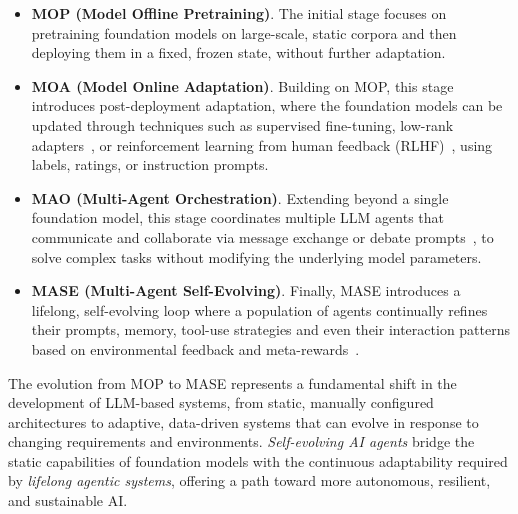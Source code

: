 \documentclass[]{selfevolagent}
\theoremstyle{plain}
\theoremstyle{definition}
\theoremstyle{remark}
\begin{document}
\begin{itemize}
    \item \textbf{MOP (Model Offline Pretraining)}. The initial stage focuses on pretraining foundation models on large-scale, static corpora and then deploying them in a fixed, frozen state, without further adaptation. 
    \item \textbf{MOA (Model Online Adaptation)}. Building on MOP, this stage introduces post-deployment adaptation, where the foundation models can be updated through techniques such as supervised fine-tuning, low-rank adapters~\citep{pfeiffer2020adapterfusion,hu2022lora}, or reinforcement learning from human feedback (RLHF)~\citep{ouyang2022training}, using labels, ratings, or instruction prompts. 
    \item \textbf{MAO (Multi-Agent Orchestration)}. Extending beyond a single foundation model, this stage coordinates multiple LLM agents that communicate and collaborate via message exchange or debate prompts~\citep{li2024improvingmultiagentdebatesparse,zhang2025if}, to solve complex tasks without modifying the underlying model parameters.
    \item \textbf{MASE (Multi-Agent Self-Evolving)}. Finally, MASE introduces a lifelong, self-evolving loop where a population of agents continually refines their prompts, memory, tool-use strategies and even their interaction patterns based on environmental feedback and meta-rewards~\citep{novikov2025alphaevolve,zhang2025darwin}.
\end{itemize}

The evolution from MOP to MASE represents a fundamental shift in the development of LLM-based systems, from static, manually configured architectures to adaptive, data-driven systems that can evolve in response to changing requirements and environments. \textit{Self-evolving AI agents} bridge the static capabilities of foundation models with the continuous adaptability required by \textit{lifelong agentic systems}, offering a path toward more autonomous, resilient, and sustainable AI. 

 
\end{document}
